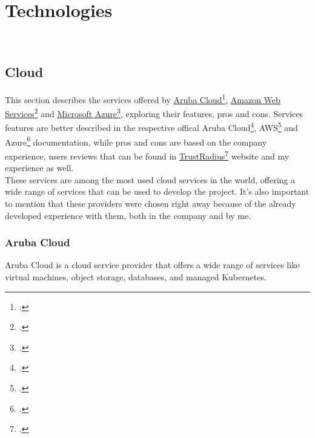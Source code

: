 \chapter{Technologies}
\label{cap:technologies}

\\

\section{Cloud}
\label{cloud}
This section describes the services offered by \href{https://www.arubacloud.com/}{Aruba Cloud}\footcite{site:aruba-cloud}, \href{https://aws.amazon.com/it/}{Amazon Web Services}\footcite{site:aws} and \href{https://azure.microsoft.com/it-it/}{Microsoft Azure}\footcite{site:azure}, exploring their features, pros and cons. 
Services features are better described in the respective offical Aruba Cloud\footcite{site:aruba-docs}, AWS\footcite{site:aws-docs} and Azure\footcite{site:azure-docs} documentation, 
while pros and cons are based on the company experience, users reviews that can be found in 
\href{https://www.trustradius.com/}{TrustRadius}\footcite{site:trust-radius} website and my experience as well.\\
These services are among the most used cloud services in the world, offering a wide range of services that can be used to develop the project.
It's also important to mention that these providers were chosen right away because of the already developed experience with them, both in the company and by me.

    \subsection{Aruba Cloud}
    \label{aruba-cloud}
    Aruba Cloud is a cloud service provider that offers a wide range of services like virtual machines, object storage, databases, and managed Kubernetes.\\

